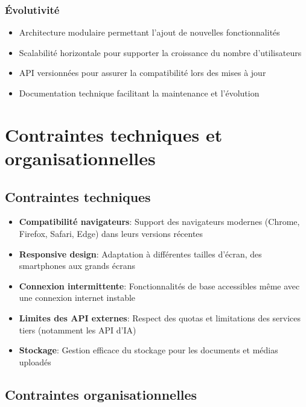 \subsubsection{Évolutivité}

\begin{itemize}
  \item Architecture modulaire permettant l'ajout de nouvelles fonctionnalités
  \item Scalabilité horizontale pour supporter la croissance du nombre d'utilisateurs
  \item API versionnées pour assurer la compatibilité lors des mises à jour
  \item Documentation technique facilitant la maintenance et l'évolution
\end{itemize}

\section{Contraintes techniques et organisationnelles}

\subsection{Contraintes techniques}

\begin{itemize}
  \item \textbf{Compatibilité navigateurs}: Support des navigateurs modernes (Chrome, Firefox, Safari, Edge) dans leurs versions récentes
  
  \item \textbf{Responsive design}: Adaptation à différentes tailles d'écran, des smartphones aux grands écrans
  
  \item \textbf{Connexion intermittente}: Fonctionnalités de base accessibles même avec une connexion internet instable
  
  \item \textbf{Limites des API externes}: Respect des quotas et limitations des services tiers (notamment les API d'IA)
  
  \item \textbf{Stockage}: Gestion efficace du stockage pour les documents et médias uploadés
\end{itemize}

\subsection{Contraintes organisationnelles}

